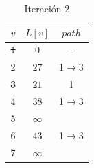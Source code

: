 \documentclass[letterpaper,10pt]{article}
\begin{document}
\begin{enumerate}
\begin{minipage}[t]{0.3\textwidth}
\begin{table}[H]
            \begin{tabular}{|c|c|c|}\hline
                $ v  $ & $L[v]$ & $path$  \\ \hline
                 \sout{ 1 } & $0$ & -      \\\hline
                 2 & $27$ & 1$\rightarrow$3   \\\hline
                 \textbf{3} & $21$ &  1  \\\hline
                 4 & $38$ & 1$\rightarrow$3   \\\hline
                 5 & $\infty$ &    \\\hline
                 6 & $43$ & 1$\rightarrow$3   \\\hline
                 7 & $\infty$ &    \\\hline
                \end{tabular}
                \caption{Iteración 2}
                \label{tablitaiteracion2}
            \end{table}
        \end{minipage}


\end{enumerate}
\end{document}
